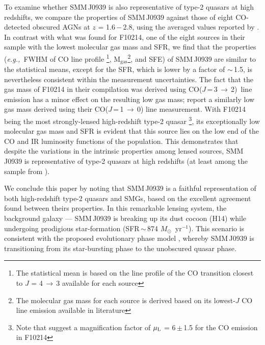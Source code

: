 \documentclass[twocolumn,apj,numberedappendix]{emulateapj}
\newcommand{\Msun}{\mbox{$M_{\odot}$}}
\newcommand{\rarr}{$\rightarrow$}
\newcommand{\CO}{\mbox{CO($J$\,=\,3\,$\rightarrow$\,2) }}
\newcommand{\eg}{{\sl e.g.,~}}
\newcommand{\pmOne}{\mbox{$^{-1}$}}
\begin{document}
To examine whether SMM\,J0939 is also representative of type-2 quasars at high redshifts, we compare the properties of SMM\,J0939
against those of eight CO-detected obscured AGNs at $z$ = 1.6\,$-$\,2.8, using the averaged values reported by \citet[][and references
therein]{Polletta11a}. %
In contrast with what was found for F10214, one of the eight sources in their sample with the lowest molecular gas mass and SFR, we find that the properties
(\eg FWHM of CO line profile \footnote{The statistical mean is based on the line profile of the CO transition closest to $J$ = 4\,\rarr\,3 available for each source}, M$_\textrm{gas}$\footnote{The molecular gas mass for each source is derived based on its lowest-$J$ CO line emission available in literature}, and SFE) of SMM\,J0939 are similar to the statistical means, except for the SFR, which is lower by a
factor of $\sim$\,1.5, is nevertheless consistent within the measurement uncertainties. The fact that the gas mass of F10214 in their compilation was derived using \CO line emission \citep{Solomon05a} has a minor effect on the resulting low gas mass; \citet{Riechers11a} report a similarly low gas mass derived using their CO($J$\,=\,1\,\rarr\,0) line measurement. 
With F10214 being the most strongly-lensed high-redshift type-2 quasar \citep[$\mu_{\textrm L}$ = 17; ][]{Solomon05a}\footnote{Note that \citet{Deane13a} suggest a magnification factor of $\mu_{\textrm L}$ = 6\,$\pm$\,1.5 for the CO emission in F10214}, its exceptionally low molecular gas mass and SFR is evident that this source lies on the low end of the CO and IR luminosity functions of the population.
This demonstrates that despite the variations in the intrinsic properties among lensed sources,
 SMM\,J0939 is representative of type-2 quasars at high redshifts (at least among the sample from \citealt{Polletta11a}).

We conclude this paper by noting that SMM\,J0939 is a faithful representation of both high-redshift type-2 quasars and SMGs,
based on the excellent agreement found between theirs properties. In this remarkable lensing system, the background galaxy --- SMM\,J0939 is
breaking up its dust cocoon (H14) while undergoing prodigious star-formation (SFR\,$\sim$\,874 \Msun~yr\pmOne).
This scenario is consistent with the proposed evolutionary phase model \citep{Sanders88,Coppin08a,Simpson12a}, whereby SMM\,J0939 is transitioning from its star-bursting phase to the unobscured quasar phase.
\end{document}
